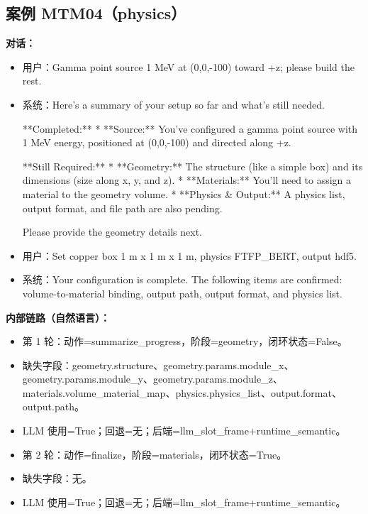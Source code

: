 \documentclass[11pt]{ctexart}
\begin{document}
\subsection{案例 MTM04（physics）}
\textbf{对话：}
\begin{itemize}
\item 用户：Gamma point source 1 MeV at (0,0,-100) toward +z; please build the rest.
\item 系统：Here's a summary of your setup so far and what's still needed.

**Completed:**
*   **Source:** You've configured a gamma point source with 1 MeV energy, positioned at (0,0,-100) and directed along +z.

**Still Required:**
*   **Geometry:** The structure (like a simple box) and its dimensions (size along x, y, and z).
*   **Materials:** You'll need to assign a material to the geometry volume.
*   **Physics \& Output:** A physics list, output format, and file path are also pending.

Please provide the geometry details next.
\item 用户：Set copper box 1 m x 1 m x 1 m, physics FTFP\_BERT, output hdf5.
\item 系统：Your configuration is complete. The following items are confirmed: volume-to-material binding, output path, output format, and physics list.
\end{itemize}
\textbf{内部链路（自然语言）：}
\begin{itemize}
\item 第 1 轮：动作=summarize\_progress，阶段=geometry，闭环状态=False。
\item 缺失字段：geometry.structure、geometry.params.module\_x、geometry.params.module\_y、geometry.params.module\_z、materials.volume\_material\_map、physics.physics\_list、output.format、output.path。
\item LLM 使用=True；回退=无；后端=llm\_slot\_frame+runtime\_semantic。
\item 第 2 轮：动作=finalize，阶段=materials，闭环状态=True。
\item 缺失字段：无。
\item LLM 使用=True；回退=无；后端=llm\_slot\_frame+runtime\_semantic。
\end{itemize}
\end{document}
